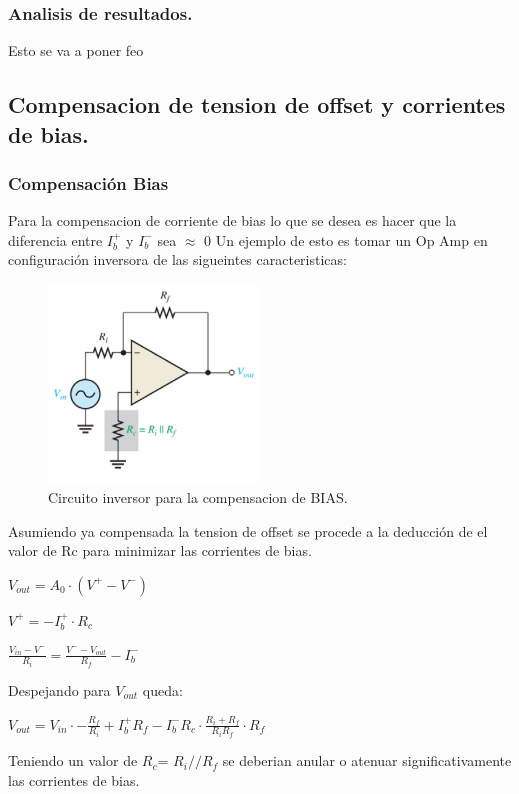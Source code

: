 \documentclass[a4paper]{article}
\begin{document}
\subsubsection{Analisis de resultados.}
Esto se va a poner feo
\subsection{Compensacion de tension de offset y corrientes de bias.}
\subsubsection{Compensación Bias}
Para la compensacion de corriente de bias lo que se desea es hacer que la diferencia entre $I_b^+$ y $I_b^-$ sea $\approx$ 0
Un ejemplo de esto es tomar un Op Amp en configuración inversora  de las sigueintes caracteristicas:
\begin{figure}[H]	
	\centering
	\includegraphics[width=0.5\textwidth]{imagenes/CompensacionBias.PNG}
	\caption{Circuito inversor para la compensacion de BIAS.}
	\label{fig:CompensacionBias}
\end{figure}
Asumiendo ya compensada la tension de offset se procede a la deducción de el valor de Rc para minimizar las corrientes de bias.
\begin{center}$V_{out}=A_0 \cdot (V^+ - V^-)$\\\end{center}
\begin{center}$V^+=-I_b^+ \cdot R_c$\\\end{center}
\begin{center}$\frac{V_{in}-V^-}{R_i}=\frac{V^- - V_{out}}{R_f} -I_b^-$\\\end{center}
Despejando para $V_{out}$ queda:
\begin{center}$V_{out}=V_{in}\cdot -\frac{R_f}{R_i}+I_b^+ R_f-I_b^- R_c \cdot \frac{R_i+R_f}{R_i R_f}\cdot R_f $\\\end{center}
Teniendo un valor de $R_c$= $R_i//R_f$ se deberian anular o atenuar significativamente las corrientes de bias.
\end{document}
